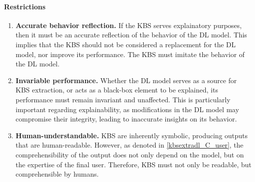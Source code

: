 \paragraph{Restrictions}
\begin{enumerate} [start=1,label={\bfseries R\arabic*.}]
    \item \textbf{Accurate behavior reflection.} \label{kbsextradl_R_behavior} If the KBS serves explainatory purposes, then it must be an accurate reflection of the behavior of the DL model. This implies that the KBS should not be considered a replacement for the DL model, nor improve its performance. The KBS must imitate the behavior of the DL model.
    
    \item \textbf{Invariable performance.} \label{kbsextradl_R_performance} Whether the DL model serves as a source for KBS extraction, or acts as a black-box element to be explained, its performance must remain invariant and unaffected. This is particularly important regarding explainability, as modifications in the DL model may compromise their integrity, leading to inaccurate insights on its behavior. 
    
    \item \textbf{Human-understandable.} \label{kbsextradl_R_human} KBS are inherently symbolic, producing outputs that are human-readable. However, as denoted in \ref{kbsextradl_C_user}, the comprehensibility of the output does not only depend on the model, but on the expertise of the final user. Therefore, KBS must not only be readable, but comprehensible by humans.
\end{enumerate}

